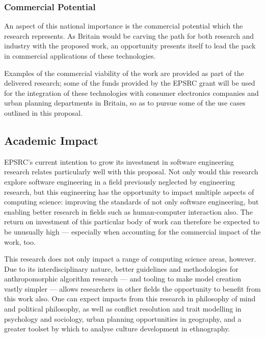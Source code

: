 \subsubsection*{Commercial Potential}
An aspect of this national importance is the commercial potential which the research represents. As Britain would be carving the path for both research and industry with the proposed work, an opportunity presents itself to lead the pack in commercial applications of these technologies.\par

Examples of the commercial viability of the work are provided as part of the delivered research; some of the funds provided by the EPSRC grant will be used for the integration of these technologies with consumer electronics companies and urban planning departments in Britain, so as to pursue some of the use cases outlined in this proposal.\par

\subsection{Academic Impact}
\label{sec:academic_impact}
EPSRC's current intention to grow its investment in software engineering research relates particularly well with this proposal. Not only would this research explore software engineering in a field previously neglected by engineering research, but this engineering has the opportunity to impact multiple aspects of computing science: improving the standards of not only software engineering, but enabling better research in fields such as human-computer interaction also. The return on investment of this particular body of work can therefore be expected to be unusually high --- especially when accounting for the commercial impact of the work, too.\par

This research does not only impact a range of computing science areas, however. Due to its interdisciplinary nature, better guidelines and methodologies for anthropomorphic algorithm research --- and tooling to make model creation vastly simpler --- allows researchers in other fields the opportunity to benefit from this work also. One can expect impacts from this research in philosophy of mind and political philosophy, as well as conflict resolution and trait modelling in psychology and sociology, urban planning opportunities in geography, and a greater toolset by which to analyse culture development in ethnography. 

\let\oldbibliography\thebibliography
\renewcommand{\thebibliography}[1]{\oldbibliography{#1}
\setlength{\itemsep}{-3pt}}


{
\scriptsize

}

